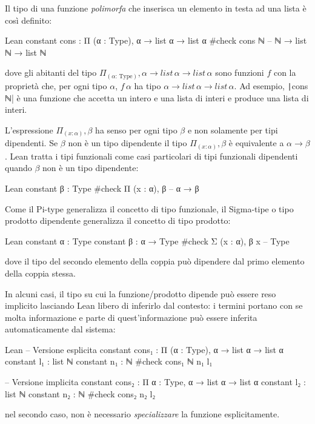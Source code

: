 Il tipo di una funzione \emph{polimorfa} che inserisca un elemento in testa ad una lista è così definito:
\begin{code}{Lean}
constant cons : Π (α : Type), α → list α → list α
#check cons ℕ -- ℕ → list ℕ → list ℕ
\end{code}
dove gli abitanti del tipo $\Pi_{(\alpha:\,\text{Type})}, \alpha \rightarrow list\,\alpha \rightarrow list\,\alpha$ sono funzioni $f$ con la proprietà che, per ogni tipo $\alpha$, $f\,\alpha$ ha tipo $\alpha\rightarrow list\,\alpha\rightarrow list\,\alpha$. Ad esempio, \texttt|cons ℕ| è una funzione che accetta un intero e una lista di interi e produce una lista di interi.

L'espressione $\Pi_{(x : \alpha)}, \beta$ ha senso per ogni tipo $\beta$ e non solamente per tipi dipendenti. Se $\beta$ non è un tipo dipendente il tipo $\Pi_{(x : \alpha)}, \beta$ è equivalente a $\alpha \rightarrow \beta$. Lean tratta i tipi funzionali come casi particolari di tipi funzionali dipendenti quando $\beta$ non è un tipo dipendente:
\begin{code}{Lean}
constant β : Type
#check Π (x : α), β -- α → β
\end{code}

Come il Pi-type generalizza il concetto di tipo funzionale, il Sigma-tipe o tipo prodotto dipendente generalizza il concetto di tipo prodotto:
\begin{code}{Lean}
constant α : Type
constant β : α → Type
#check Σ (x : α), β x -- Type
\end{code}
dove il tipo del secondo elemento della coppia può dipendere dal primo elemento della coppia stessa.

In alcuni casi, il tipo su cui la funzione/prodotto dipende può essere reso implicito lasciando Lean libero di inferirlo dal contesto: i termini portano con se molta informazione e parte di quest'informazione può essere inferita automaticamente dal sistema:
\begin{code}{Lean}
-- Versione esplicita
constant cons₁ : Π (α : Type), α → list α → list α
constant l₁ : list ℕ
constant n₁ : ℕ
#check cons₁ ℕ n₁ l₁

-- Versione implicita
constant cons₂ : Π {α : Type}, α → list α → list α
constant l₂ : list ℕ
constant n₂ : ℕ
#check cons₂ n₂ l₂
\end{code}
nel secondo caso, non è necessario \emph{specializzare} la funzione esplicitamente.

